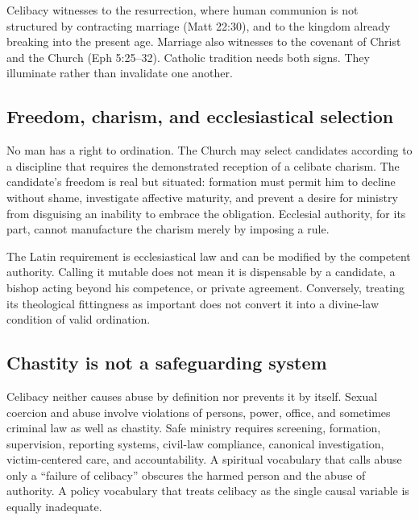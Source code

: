 Celibacy witnesses to the resurrection, where human communion is not structured by contracting marriage (Matt 22:30), and to the kingdom already breaking into the present age. Marriage also witnesses to the covenant of Christ and the Church (Eph 5:25--32). Catholic tradition needs both signs. They illuminate rather than invalidate one another.

\subsection{Freedom, charism, and ecclesiastical selection}

No man has a right to ordination. The Church may select candidates according to a discipline that requires the demonstrated reception of a celibate charism. The candidate's freedom is real but situated: formation must permit him to decline without shame, investigate affective maturity, and prevent a desire for ministry from disguising an inability to embrace the obligation. Ecclesial authority, for its part, cannot manufacture the charism merely by imposing a rule.

The Latin requirement is ecclesiastical law and can be modified by the competent authority. Calling it mutable does not mean it is dispensable by a candidate, a bishop acting beyond his competence, or private agreement. Conversely, treating its theological fittingness as important does not convert it into a divine-law condition of valid ordination.

\subsection{Chastity is not a safeguarding system}

Celibacy neither causes abuse by definition nor prevents it by itself. Sexual coercion and abuse involve violations of persons, power, office, and sometimes criminal law as well as chastity. Safe ministry requires screening, formation, supervision, reporting systems, civil-law compliance, canonical investigation, victim-centered care, and accountability. A spiritual vocabulary that calls abuse only a ``failure of celibacy'' obscures the harmed person and the abuse of authority. A policy vocabulary that treats celibacy as the single causal variable is equally inadequate.

